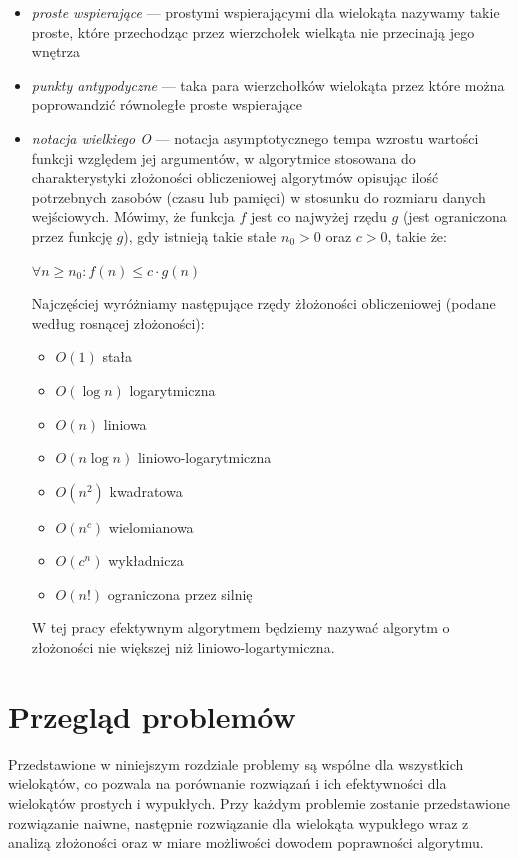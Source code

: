 \documentclass[oneside,brudnopis]{xelatex-mgr/xmgr}
\begin{document}
\begin{itemize}
\item{\emph{proste wspierające}} --- prostymi wspierającymi dla wielokąta
  nazywamy takie proste, które przechodząc przez wierzchołek wielkąta
  nie przecinają jego wnętrza

\item{\emph{punkty antypodyczne}} --- taka para wierzchołków wielokąta przez
  które można poprowandzić równoległe proste wspierające

\item{\emph{notacja wielkiego O}} --- notacja asymptotycznego tempa
  wzrostu wartości funkcji względem jej argumentów, w algorytmice
  stosowana do charakterystyki złożoności obliczeniowej algorytmów
  opisując ilość potrzebnych zasobów (czasu lub pamięci) w stosunku do
  rozmiaru danych wejściowych. Mówimy, że funkcja $f$ jest co najwyżej
  rzędu $g$ (jest ograniczona przez funkcję $g$), gdy istnieją takie
  stałe $n_0 > 0$ oraz $c > 0$, takie że:

  \begin{center}
    $\forall n \geq n_0 : f(n) \leq c \cdot g(n)$
  \end{center}

  Najczęściej wyróżniamy następujące rzędy żłożoności obliczeniowej
  (podane według rosnącej złożoności):

  \begin{itemize}
    \item{$O(1)$} stała
    \item{$O(\log n)$} logarytmiczna
    \item{$O(n)$} liniowa
    \item{$O(n \log n)$} liniowo-logarytmiczna
    \item{$O(n^2)$} kwadratowa
    \item{$O(n^c)$} wielomianowa
    \item{$O(c^n)$} wykładnicza
    \item{$O(n!)$} ograniczona przez silnię
  \end{itemize}

  W tej pracy efektywnym algorytmem będziemy nazywać algorytm o
  złożoności nie większej niż liniowo-logartymiczna.
\end{itemize}

\chapter{Przegląd problemów}
Przedstawione w niniejszym rozdziale problemy są wspólne dla
wszystkich wielokątów, co pozwala na porównanie rozwiązań i ich
efektywności dla wielokątów prostych i wypukłych. Przy każdym
problemie zostanie przedstawione rozwiązanie naiwne, następnie
rozwiązanie dla wielokąta wypukłego wraz z analizą złożoności oraz
w miare możliwości dowodem poprawności algorytmu.
\end{document}
